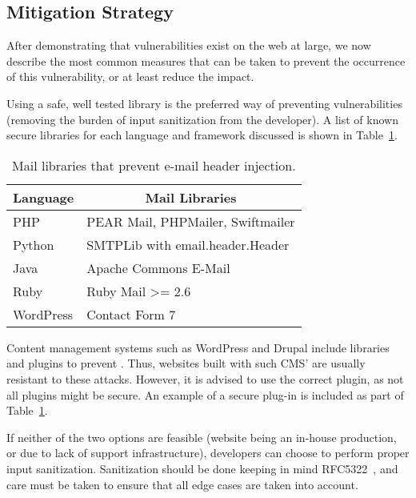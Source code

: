 \subsection{Mitigation Strategy}
\label{disc:mitigation}
After demonstrating that \ehi vulnerabilities exist on the web at large, we now describe the most common measures that can be taken to prevent the occurrence of this vulnerability, or at least reduce the impact.

Using a safe, well tested \email library is the preferred way of
preventing \ehi vulnerabilities (removing the burden of input
sanitization from the developer). A list of known secure libraries for
each language and framework discussed is shown in
Table~\ref{tab:maillib}.
	\begin{table}[tbp]
		\centering
		\scriptsize
		\begin{tabular}{|l|l|}
			\hline
			\multicolumn{1}{|c|}{\textbf{Language}} &
			\multicolumn{1}{c|}{\textbf{Mail Libraries}} \\
			\hline
			PHP & {{PEAR Mail\cite{Hagenbuch2016}, PHPMailer\cite{PHPMailer2016}, Swiftmailer\cite{SwiftMailer2016}}}\\
			\hline
			Python & SMTPLib with email.header.Header\\
			\hline
			Java & Apache Commons E-Mail\cite{ACE2016}\\
			\hline
			Ruby & Ruby Mail \textgreater{}= 2.6\cite{RubyMailGem2016}\\
			\hline
			WordPress & Contact Form 7\cite{CF7}\\
			\hline
		\end{tabular}
		\caption[]{Mail libraries that prevent e-mail header
          injection.}
        \vspace{-5ex}        
		\label{tab:maillib}
	\end{table}

Content management systems such as WordPress and Drupal include
libraries and plugins to prevent \ehi. Thus, websites built with such
CMS' are usually resistant to these attacks. However, it is advised to
use the correct \email plugin, as not all plugins might be secure. An
example of a secure plug-in is included as part of
Table~\ref{tab:maillib}.
	
If neither of the two options are feasible (website being an in-house
production, or due to lack of support infrastructure), developers can
choose to perform proper input sanitization. Sanitization should be
done keeping in mind RFC5322~\cite{rfc5322}, and care must be taken to
ensure that all edge cases are taken into account.
	


